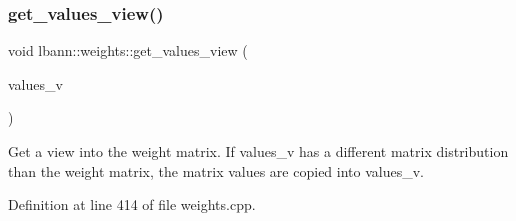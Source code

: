 \subsubsection{\texorpdfstring{get\+\_\+values\+\_\+view()}{get\_values\_view()}}
{\footnotesize\ttfamily void lbann\+::weights\+::get\+\_\+values\+\_\+view (\begin{DoxyParamCaption}\item[{\hyperlink{base_8hpp_a9a697a504ae84010e7439ffec862b470}{Abs\+Dist\+Mat} \&}]{values\+\_\+v }\end{DoxyParamCaption})}

Get a view into the weight matrix. If values\+\_\+v has a different matrix distribution than the weight matrix, the matrix values are copied into values\+\_\+v. 

Definition at line 414 of file weights.\+cpp.


